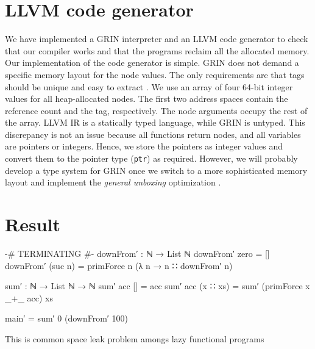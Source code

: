 \documentclass[10pt, twocolumn]{article}
\begin{document}
\section{LLVM code generator}
We have implemented a GRIN interpreter and an LLVM code generator to check that our compiler works and that the programs reclaim all the allocated memory. 
Our implementation of the code generator is simple. 
GRIN does not demand a specific memory layout for the node values.
The only requirements are that tags should be unique and easy to extract \citep{boquist1999}.
We use an array of four 64-bit integer values for all heap-allocated nodes. 
The first two address spaces contain the reference count and the tag, respectively.
The node arguments occupy the rest of the array.
LLVM IR is a statically typed language, while GRIN is untyped.
This discrepancy is not an issue because all functions return nodes, and all variables are pointers or integers.
Hence, we store the pointers as integer values and convert them to the pointer type (\lstinline{ptr}) as required.
However, we will probably develop a type system for GRIN once we switch to a more sophisticated memory layout and implement the \emph{general unboxing} optimization \citep{boquist1999}.

\section{Result}

\begin{code}
{-# TERMINATING #-}
downFrom′ : ℕ → List ℕ
downFrom′ zero = []
downFrom′ (suc n) = 
  primForce n (λ n → n ∷ downFrom′ n)

sum′ : ℕ → List ℕ → ℕ
sum′ acc [] = acc
sum′ acc (x ∷ xs) = 
  sum′ (primForce x _+_ acc) xs

main′ = sum′ 0 (downFrom′ 100) 
\end{code}

This is common space leak problem amongs lazy functional programs \citep{wadler1987}




\end{document}

